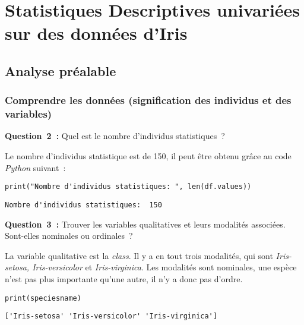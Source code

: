 \section{Statistiques Descriptives univariées sur des données d’Iris}
\subsection{Analyse préalable}
\subsubsection*{Comprendre les données (signification des individus et des variables)}

\vspace{.2cm}

\noindent
\textbf{Question~2~:} Quel est le nombre d’individus statistiques~? 
\vspace{.2cm}

Le nombre d'individus statistique est de 150, il peut être obtenu grâce au code \textit{Python} suivant~:
\begin{lstlisting}[style=myPython, caption=Code Python pour obtenir le nombre d'individus statistiques, frame=lines]
print("Nombre d'individus statistiques: ", len(df.values))
\end{lstlisting}

\begin{lstlisting}[style=myLog, caption=Résultat du code, frame=lines]
Nombre d'individus statistiques:  150
\end{lstlisting}

\vspace{.5cm}

\noindent
\textbf{Question~3~:} Trouver les variables qualitatives et leurs modalités associées. Sont-elles nominales ou ordinales~? 
\vspace{.2cm}

La variable qualitative est la \textit{class}. Il y a en tout trois modalités, qui sont \textit{Iris-setosa, Iris-versicolor} et \textit{Iris-virginica}. 
Les modalités sont nominales, une espèce n'est pas plus importante qu'une autre, il n'y a donc pas d'ordre.
\begin{lstlisting}[style=myPython, caption=Code Python pour obtenir les modalités, frame=lines]
print(speciesname)
\end{lstlisting}

\begin{lstlisting}[style=myLog, caption=Résultat du code, frame=lines]
['Iris-setosa' 'Iris-versicolor' 'Iris-virginica']
\end{lstlisting}

